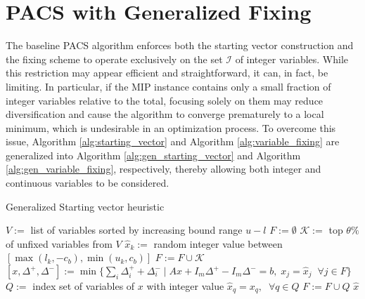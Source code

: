 
\section{PACS with Generalized Fixing}
The baseline PACS algorithm enforces both the starting vector construction and the fixing scheme to operate exclusively on the set $\mathcal{I}$ of integer variables. While this restriction may appear efficient and straightforward, it can, in fact, be limiting. In particular, if the MIP instance contains only a small fraction of integer variables relative to the total, focusing solely on them may reduce diversification and cause the algorithm to converge prematurely to a local minimum, which is undesirable in an optimization process.
To overcome this issue, Algorithm \ref{alg:starting_vector} and Algorithm \ref{alg:variable_fixing} are generalized into Algorithm \ref{alg:gen_starting_vector} and Algorithm \ref{alg:gen_variable_fixing}, respectively, thereby allowing both integer and continuous variables to be considered.
\begin{algorithm}[H]
\caption{Generalized Starting vector heuristic}\label{alg:gen_starting_vector}
\begin{algorithmic}[1]
\State $V :=$ list of  variables sorted by increasing bound range $u-l$
\State $F := \emptyset$
    \State $\mathcal{K} :=$ top $\theta \%$ of unfixed variables from $V$
        \State $\hat{x}_k :=$ random integer value between $[\max(l_k, -c_b), \min(u_k, c_b)]$
    \EndFor
    \State $F := F \cup \mathcal{K}$
    \State $[x, \Delta^+, \Delta^-] := \min\{\sum_i \Delta_i^+ + \Delta_i^- \mid A x + I_m \Delta^+ - I_m \Delta^- = b, \; x_j = \hat{x}_j \;\; \forall j \in F\}$
    \State $Q :=$ index set of  variables of $x$ with integer value
    \State $\hat{x}_q = x_q, \;\; \forall q \in Q$
    \State $F := F \cup Q$
\EndWhile
\State \Return $\hat{x}$
\end{algorithmic}
\end{algorithm}
